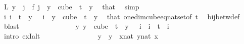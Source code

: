 \begin{isabellebody}
\ {\isachardoublequoteopen}L\ {\isacharparenleft}{\kern0pt}y\ {}{\isacharparenright}{\kern0pt}\ j\ {\isacharequal}{\kern0pt}\ f\ j{\isachardoublequoteclose}\ \ {\isachardoublequoteopen}y\ {\isasymin}\ cube\ {}\ t{\isachardoublequoteclose}\ \ y\ \isamarkupfalse%
\ that\ \isamarkupfalse%
\ simp\isanewline
\ \ \ \ \ \ \ \ \ \ \ \ \isamarkupfalse%
\ \isamarkupfalse%
\ {\isachardoublequoteopen}{\isasymexists}{\isacharbang}{\kern0pt}i{\isachardot}{\kern0pt}\ i\ {\isacharless}{\kern0pt}\ t\ {\isasymand}\ y\ {}\ {\isacharequal}{\kern0pt}\ i{\isachardoublequoteclose}\ \ {\isachardoublequoteopen}y\ {\isasymin}\ cube\ {}\ t{\isachardoublequoteclose}\ \ y\ \isamarkupfalse%
\ that\ one{\isacharunderscore}{\kern0pt}dim{\isacharunderscore}{\kern0pt}cube{\isacharunderscore}{\kern0pt}eq{\isacharunderscore}{\kern0pt}nat{\isacharunderscore}{\kern0pt}set{\isacharbrackleft}{\kern0pt}of\ {\isachardoublequoteopen}t{\isachardoublequoteclose}{\isacharbrackright}{\kern0pt}\ \isamarkupfalse%
\ bij{\isacharunderscore}{\kern0pt}betw{\isacharunderscore}{\kern0pt}def\ \isamarkupfalse%
\ blast\isanewline
\ \ \ \ \ \ \ \ \ \ \ \ \isamarkupfalse%
\ \isamarkupfalse%
\ {\isachardoublequoteopen}{\isasymexists}{\isacharbang}{\kern0pt}y{\isachardot}{\kern0pt}\ y\ {\isasymin}\ cube\ {}\ t\ {\isasymand}\ y\ {}\ {\isacharequal}{\kern0pt}\ i{\isachardoublequoteclose}\ \ {\isachardoublequoteopen}i\ {\isacharless}{\kern0pt}\ t{\isachardoublequoteclose}\ \ i\ \isanewline
\ \ \ \ \ \ \ \ \ \ \ \ \isamarkupfalse%
\ {\isacharparenleft}{\kern0pt}intro\ ex{}I{\isacharunderscore}{\kern0pt}alt{\isacharparenright}{\kern0pt}\isanewline
\ \ \ \ \ \ \ \ \ \ \ \ \ \ \isamarkupfalse%
\ y\ \ {\isachardoublequoteopen}y\ {\isasymequiv}\ {\isacharparenleft}{\kern0pt}{\isasymlambda}x{\isacharcolon}{\kern0pt}{\isacharcolon}{\kern0pt}nat{\isachardot}{\kern0pt}\ {\isasymlambda}y{\isasymin}{\isacharbraceleft}{\kern0pt}{\isachardot}{\kern0pt}{\isachardot}{\kern0pt}{\isacharless}{\kern0pt}{}{\isacharcolon}{\kern0pt}{\isacharcolon}{\kern0pt}nat{\isacharbraceright}{\kern0pt}{\isachardot}{\kern0pt}\ x{\isacharparenright}{\kern0pt}{\isachardoublequoteclose}\ \isanewline
\ \ \ \ \ \ \ \ \ \ \ \ \ \ \isamarkupfalse%

\end{isabellebody}

